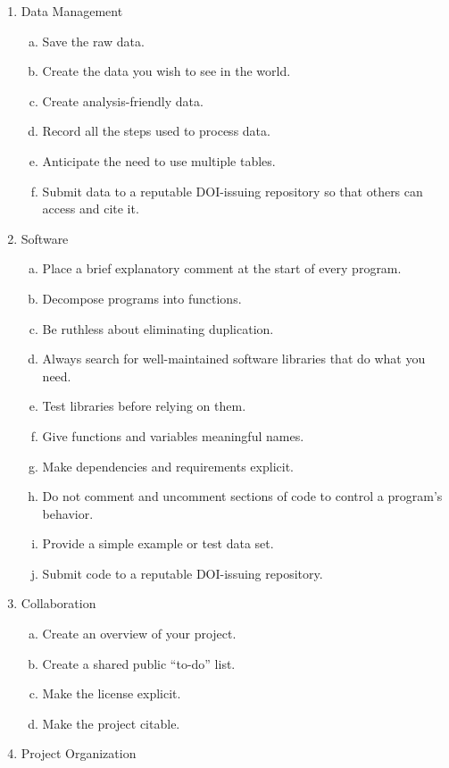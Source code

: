 \documentclass[10pt,letterpaper]{article}
\begin{document}
{\footnotesize
\begin{enumerate}
\item Data Management
  \begin{enumerate}[a)]
  \item Save the raw data.
  \item Create the data you wish to see in the world.
  \item Create analysis-friendly data.
  \item Record all the steps used to process data.
  \item Anticipate the need to use multiple tables.
  \item Submit data to a reputable DOI-issuing repository so that others can access and cite it.
  \end{enumerate}
\item Software
  \begin{enumerate}[a)]
  \item Place a brief explanatory comment at the start of every program.
  \item Decompose programs into functions.
  \item Be ruthless about eliminating duplication.
  \item Always search for well-maintained software libraries that do what you need.
  \item Test libraries before relying on them.
  \item Give functions and variables meaningful names.
  \item Make dependencies and requirements explicit.
  \item Do not comment and uncomment sections of code to control a program's behavior.
  \item Provide a simple example or test data set.
  \item Submit code to a reputable DOI-issuing repository.
  \end{enumerate}
\item Collaboration
  \begin{enumerate}[a)]
  \item Create an overview of your project.
  \item Create a shared public ``to-do'' list.
  \item Make the license explicit.
  \item Make the project citable.
  \end{enumerate}
\item Project Organization
  \begin{enumerate}[a)]

\end{enumerate}
\end{enumerate}}
\end{document}
